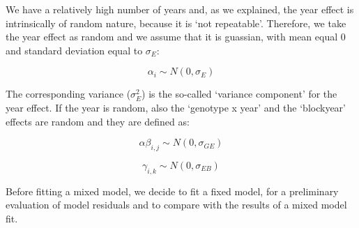 \documentclass[a4paper,12pt,oneside]{book}
\newenvironment{Shaded}{\begin{snugshade}}{\end{snugshade}}
\newcommand{\SpecialCharTok}[1]{#1}
\newcommand{\DocumentationTok}[1]{#1}
\newcommand{\OtherTok}[1]{#1}
\newcommand{\FunctionTok}[1]{#1}
\newcommand{\AttributeTok}[1]{#1}
\newcommand{\NormalTok}[1]{#1}
\begin{document}
We have a relatively high number of years and, as we explained, the year effect is intrinsically of random nature, because it is `not repeatable'. Therefore, we take the year effect as random and we assume that it is guassian, with mean equal 0 and standard deviation equal to \(\sigma_E\):

\[\alpha_i \sim N(0, \sigma_E)\]

The corresponding variance (\(\sigma^2_E\)) is the so-called `variance component' for the year effect. If the year is random, also the `genotype x year' and the `block\textbar year' effects are random and they are defined as:

\[\alpha\beta_{i,j} \sim N(0, \sigma_{GE})\]

\[\gamma_{i,k} \sim N(0, \sigma_{EB})\]

Before fitting a mixed model, we decide to fit a fixed model, for a preliminary evaluation of model residuals and to compare with the results of a mixed model fit.

\begin{Shaded}
\end{Shaded}
\end{document}
